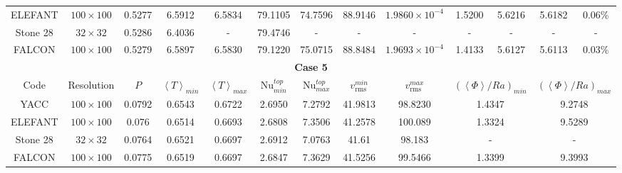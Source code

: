 \documentclass[hidelinks,10pt,a4paper]{article}
\begin{document}
\begin{table}
{\begin{tabular}{|cc|ccccccccccc|}
       ELEFANT & $100\times100$ & 0.5277 & 6.5912 & 6.5834 & 79.1105 & 74.7596 & 88.9146 & $1.9860\times10^{-4}$ & 1.5200 & 5.6216 & 5.6182 & 0.06\% \\
       \rowcolor{gray!25!}
       Stone 28 & $32\times32$ & 0.5286 & 6.4036 & - & 79.4746 & - & - & - & - & - & - & - \\
       FALCON & $100\times100$ & 0.5279 & 6.5897 & 6.5830 & 79.1220 & 75.0715 & 88.8484 & $1.9693\times10^{-4}$ & 1.4133 & 5.6127 & 5.6113 & 0.03\% \\
       \midrule
       \multicolumn{13}{|c|}{\textbf{Case 5}} \\
       \midrule
       Code & Resolution & $P$ & $\left\langle T \right\rangle_{min}$ & $\left\langle T \right\rangle_{max}$ & Nu$^{top}_{min}$ & Nu$^{top}_{max}$ &
       $v_{\textrm{rms}}^{min}$ & $v_{\textrm{rms}}^{max}$ & \multicolumn{2}{c}{$(\left\langle \Phi \right\rangle/Ra)_{min}$} & 
       \multicolumn{2}{c|}{$(\left\langle \Phi \right\rangle/Ra)_{max}$} \\
       \hline
       \rowcolor{gray!25!}
         YACC & $100\times100$ & 0.0792 & 0.6543 & 0.6722 & 2.6950 & 7.2792 & 41.9813 & 98.8230 & \multicolumn{2}{c}{1.4347} & 
         \multicolumn{2}{c|}{9.2748} \\
         ELEFANT & $100\times100$ & 0.076 & 0.6514 & 0.6693 & 2.6808 & 7.3506 & 41.2578 & 100.089 & \multicolumn{2}{c}{1.3324} & 
         \multicolumn{2}{c|}{9.5289} \\
         \rowcolor{gray!25!}
         Stone 28 & $32\times32$ & 0.0764 & 0.6521 & 0.6697 & 2.6912 & 7.0763 & 41.61 & 98.183 & \multicolumn{2}{c}{-} & 
         \multicolumn{2}{c|}{-} \\
         FALCON & $100\times100$ & 0.0775 & 0.6519 & 0.6697 & 2.6847 & 7.3629 & 41.5256 & 99.5466 & \multicolumn{2}{c}{1.3399} & 
         \multicolumn{2}{c|}{9.3993} \\
  \bottomrule
  \end{tabular}}
  \label{tab:visco_mantle}
  \end{table}
\end{document}
